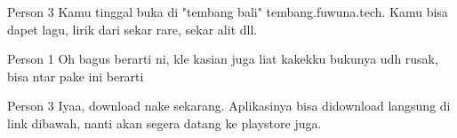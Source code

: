 \documentclass{screenplay}[2012/06/30]
\begin{document}
\begin{dialogue}{Person 3}
    Kamu tinggal buka di "tembang bali" tembang.fuwuna.tech. Kamu bisa dapet lagu, lirik dari sekar rare, sekar alit dll.
\end{dialogue}
\begin{dialogue}{Person 1}
    Oh bagus berarti ni, kle kasian juga liat kakekku bukunya udh rusak, bisa ntar pake ini berarti
\end{dialogue}
\begin{dialogue}{Person 3}
   Iyaa, download nake sekarang. Aplikasinya bisa didownload langsung di link dibawah, nanti akan segera datang ke playstore juga.
\end{dialogue}
\end{document}
